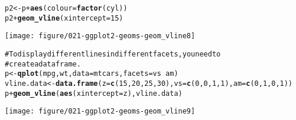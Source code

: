 \documentclass[a4paper,titlepage]{tufte-handout}\usepackage{graphicx, color}
\makeatletter
\def\maxwidth{ %
  \ifdim\Gin@nat@width>\linewidth
    \linewidth
  \else
    \Gin@nat@width
  \fi
}
\newcommand{\hlfunctioncall}[1]{\textcolor[rgb]{0.501960784313725,0,0.329411764705882}{\textbf{#1}}}%
\newcommand{\hlcomment}[1]{\textcolor[rgb]{0.180392156862745,0.6,0.341176470588235}{#1}}%
\newenvironment{kframe}{%
 \def\at@end@of@kframe{}%
 \ifinner\ifhmode%
  \def\at@end@of@kframe{\end{minipage}}%
  \begin{minipage}{\columnwidth}%
 \fi\fi%
 \def\FrameCommand##1{\hskip\@totalleftmargin \hskip-\fboxsep
 \colorbox{shadecolor}{##1}\hskip-\fboxsep
     \hskip-\linewidth \hskip-\@totalleftmargin \hskip\columnwidth}%
 \MakeFramed {\advance\hsize-\width
   \@totalleftmargin\z@ \linewidth\hsize
   \@setminipage}}%
 {\par\unskip\endMakeFramed%
 \at@end@of@kframe}
\newenvironment{knitrout}{}{} %
\makeatother
\begin{document}
\begin{knitrout}
\begin{kframe}
\begin{alltt}
p2 <- p + \hlfunctioncall{aes}(colour = \hlfunctioncall{factor}(cyl))
p2 + \hlfunctioncall{geom_vline}(xintercept = 15)
\end{alltt}
\end{kframe}
\texttt{[image: figure/021-ggplot2-geoms-geom\_vline8]} 
\begin{kframe}\begin{alltt}

\hlcomment{# To display different lines in different facets, you need to}
\hlcomment{# create a data frame.}
p <- \hlfunctioncall{qplot}(mpg, wt, data=mtcars, facets = vs ~ am)
vline.data <- \hlfunctioncall{data.frame}(z = \hlfunctioncall{c}(15, 20, 25, 30), vs = \hlfunctioncall{c}(0, 0, 1, 1), am = \hlfunctioncall{c}(0, 1, 0, 1))
p + \hlfunctioncall{geom_vline}(\hlfunctioncall{aes}(xintercept = z), vline.data)
\end{alltt}
\end{kframe}
\texttt{[image: figure/021-ggplot2-geoms-geom\_vline9]} 
\begin{kframe}\begin{alltt}


\end{alltt}
\end{kframe}
\end{knitrout}
\end{document}
